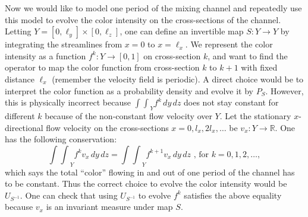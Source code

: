 Now we would like to model one period of the mixing channel and repeatedly use this model to evolve the color intensity on the cross-sections of the channel. Letting $Y = [0,\ell_y]\times[0,\ell_z]$, one can define an invertible map $S:Y\to Y$ by integrating
the streamlines from $x=0$ to $x=\ell_x$. We represent the color intensity as a function $f^k : Y \to [0,1] $ on cross-section $k$, and want to find the operator to map the color function from cross-section $k$ to $k+1$ with fixed distance $\ell_x$ (remember the velocity field is periodic). A direct choice would be to interpret the color function as a probability density and evolve it by $P_S$. However, this is physically incorrect because ${\int\int}_Y f^k \,dy\,dz$ does not stay constant for different $k$ because of the non-constant flow velocity over $Y$. Let the stationary $x$-directional flow velocity on the cross-sections $x=0, l_x, 2l_x, \ldots$ be $v_x: Y \to \mathbb{R}$. One has the following conservation:
\begin{equation}
\label{fvc}
  {\int\int}_Y f^k v_x \,dy\,dz = {\int\int}_Y f^{k+1} v_x \,dy\,dz \text{  , for }k=0,1,2,\ldots,
\end{equation}
which says the total ``color'' flowing in and out of one period of the channel has to be constant. Thus the correct choice to evolve the color intensity would be $U_{S^{-1}}$. One can check that using $U_{S^{-1}}$ to evolve $f^k$ satisfies the above equality because $v_x$ is an invariant measure under map $S$. 




